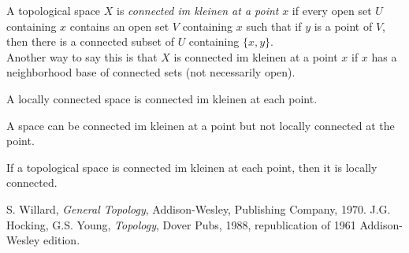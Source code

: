 \documentclass[12pt]{article}
\begin{document}
A topological space $ X$ is {\it connected im kleinen  at a point} $ x $ if every open set $ U$ containing $ x$ contains an  open set  $ V$ containing $ x$ such that if $ y$ is a point of $ V$, then there is a connected subset of $ U$ containing $\{x,y\}$. 
\\ Another way to say this is that $X$ is connected im kleinen at a point $x$ if $x$ has a neighborhood base of connected sets (not necessarily open).

A locally connected space is connected im kleinen at each point. 

A space can be connected im kleinen at a point but not locally connected at the point. 


If a topological space is connected im kleinen at each point, then it is locally 
connected. 

 \begin{thebibliography}{9}
 S. Willard, \emph{General Topology},
Addison-Wesley, Publishing Company, 1970.
 J.G. Hocking, G.S. Young, \emph{Topology}, Dover Pubs,
1988, republication of 1961 Addison-Wesley edition.
\end{thebibliography}
\end{document}
